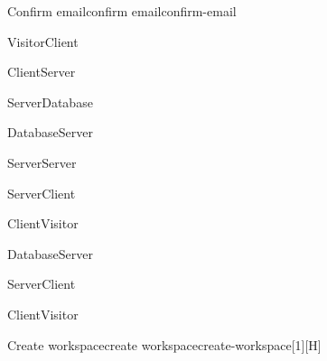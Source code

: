 \begin{toexclude}
  \begin{sdfig}{Confirm email}{confirm email}{confirm-email}

    \begin{umlcall}[op={Confirm}]{Visitor}{Client}
      \begin{umlcall}[op={Confirm}]{Client}{Server}
        \begin{umlcall}[op={Has OTP}]{Server}{Database}
          \begin{umlfragment}[type=alt, label=true]
            \begin{umlcall}[type=return,op={Yes}]{Database}{Server}
              \begin{umlcall}[op={Add cookies}]{Server}{Server}
              \end{umlcall}
              \begin{umlcall}[type=return,op={Done}]{Server}{Client}
                \begin{umlcall}[type=return,op={Done}]{Client}{Visitor}
                \end{umlcall}
              \end{umlcall}
            \end{umlcall}
            \umlfpart[else]
            \begin{umlcall}[type=return,op={No}]{Database}{Server}
              \begin{umlcall}[type=return,op={Error}]{Server}{Client}
                \begin{umlcall}[type=return,op={Error}]{Client}{Visitor}
                \end{umlcall}
              \end{umlcall}
            \end{umlcall}
          \end{umlfragment}
        \end{umlcall}
      \end{umlcall}
    \end{umlcall}
  \end{sdfig}


  \begin{sdfig}{Create workspace}{create workspace}{create-workspace}[1][H]


\end{sdfig}
\end{toexclude}
